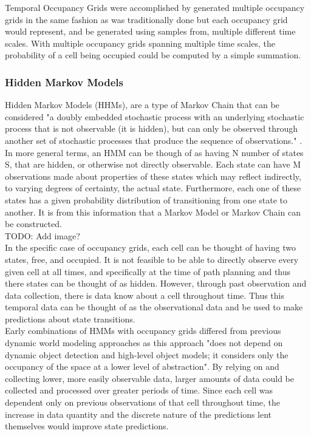   Temporal Occupancy Grids were accomplished by generated multiple occupancy
  grids in the same fashion as was traditionally done but each occupancy grid
  would represent, and be generated using samples from, multiple different time
  scales. With multiple occupancy grids spanning multiple time scales, the
  probability of a cell being occupied could be computed by a simple summation.

  \subsubsection{ Hidden Markov Models }

  Hidden Markov Models (HHMs), are a type of Markov Chain that can be considered
  "a doubly embedded stochastic process with an underlying stochastic process
  that is not observable (it is hidden), but can only be observed through
  another set of stochastic processes that produce the sequence of observations."
  \cite{Rabiner1989}. In more general terms, an HMM can be though of as having N
  number of states S, that are hidden, or otherwise not directly observable.
  Each state can have M observations made about properties of these states which
  may reflect indirectly, to varying degrees of certainty, the actual state.
  Furthermore, each one of these states has a given probability distribution of
  transitioning from one state to another. It is from this information that a
  Markov Model or Markov Chain can be constructed. \\

  TODO: Add image? \\

  In the specific case of occupancy grids, each cell can be thought of having two
  states, free, and occupied. It is not feasible to be able to directly observe
  every given cell at all times, and specifically at the time of path planning
  and thus there states can be thought of as hidden. However, through past
  observation and data collection, there is data know about a cell throughout
  time. Thus this temporal data can be thought of as the observational data and
  be used to make predictions about state transitions. \\

  Early combinations of HMMs with occupancy grids differed from previous dynamic
  world modeling approaches as this approach "does not depend on dynamic object
  detection and high-level object models; it considers only the occupancy of the
  space at a lower level of abstraction"\cite{Meyer-Delius2012}. By relying on
  and collecting lower, more easily observable data, larger amounts of data could
  be collected and processed over greater periods of time. Since each cell was
  dependent only on previous observations of that cell throughout time, the
  increase in data quantity and the discrete nature of the predictions lent
  themselves would improve state predictions. \\

